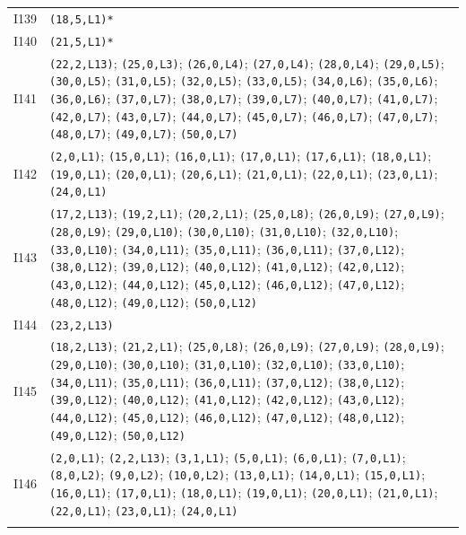 {\begin{longtable}{@{}r p{14.7cm}@{}}
I139 & \texttt{(18,5,L1)*}\\\addlinespace[3pt]
I140 & \texttt{(21,5,L1)*}\\\addlinespace[3pt]
I141 & \texttt{(22,2,L13)}; \texttt{(25,0,L3)}; \texttt{(26,0,L4)}; \texttt{(27,0,L4)}; \texttt{(28,0,L4)}; \texttt{(29,0,L5)}; \texttt{(30,0,L5)}; \texttt{(31,0,L5)}; \texttt{(32,0,L5)}; \texttt{(33,0,L5)}; \texttt{(34,0,L6)}; \texttt{(35,0,L6)}; \texttt{(36,0,L6)}; \texttt{(37,0,L7)}; \texttt{(38,0,L7)}; \texttt{(39,0,L7)}; \texttt{(40,0,L7)}; \texttt{(41,0,L7)}; \texttt{(42,0,L7)}; \texttt{(43,0,L7)}; \texttt{(44,0,L7)}; \texttt{(45,0,L7)}; \texttt{(46,0,L7)}; \texttt{(47,0,L7)}; \texttt{(48,0,L7)}; \texttt{(49,0,L7)}; \texttt{(50,0,L7)}\\\addlinespace[3pt]
I142 & \texttt{(2,0,L1)}; \texttt{(15,0,L1)}; \texttt{(16,0,L1)}; \texttt{(17,0,L1)}; \texttt{(17,6,L1)}; \texttt{(18,0,L1)}; \texttt{(19,0,L1)}; \texttt{(20,0,L1)}; \texttt{(20,6,L1)}; \texttt{(21,0,L1)}; \texttt{(22,0,L1)}; \texttt{(23,0,L1)}; \texttt{(24,0,L1)}\\\addlinespace[3pt]
I143 & \texttt{(17,2,L13)}; \texttt{(19,2,L1)}; \texttt{(20,2,L1)}; \texttt{(25,0,L8)}; \texttt{(26,0,L9)}; \texttt{(27,0,L9)}; \texttt{(28,0,L9)}; \texttt{(29,0,L10)}; \texttt{(30,0,L10)}; \texttt{(31,0,L10)}; \texttt{(32,0,L10)}; \texttt{(33,0,L10)}; \texttt{(34,0,L11)}; \texttt{(35,0,L11)}; \texttt{(36,0,L11)}; \texttt{(37,0,L12)}; \texttt{(38,0,L12)}; \texttt{(39,0,L12)}; \texttt{(40,0,L12)}; \texttt{(41,0,L12)}; \texttt{(42,0,L12)}; \texttt{(43,0,L12)}; \texttt{(44,0,L12)}; \texttt{(45,0,L12)}; \texttt{(46,0,L12)}; \texttt{(47,0,L12)}; \texttt{(48,0,L12)}; \texttt{(49,0,L12)}; \texttt{(50,0,L12)}\\\addlinespace[3pt]
I144 & \texttt{(23,2,L13)}\\\addlinespace[3pt]
I145 & \texttt{(18,2,L13)}; \texttt{(21,2,L1)}; \texttt{(25,0,L8)}; \texttt{(26,0,L9)}; \texttt{(27,0,L9)}; \texttt{(28,0,L9)}; \texttt{(29,0,L10)}; \texttt{(30,0,L10)}; \texttt{(31,0,L10)}; \texttt{(32,0,L10)}; \texttt{(33,0,L10)}; \texttt{(34,0,L11)}; \texttt{(35,0,L11)}; \texttt{(36,0,L11)}; \texttt{(37,0,L12)}; \texttt{(38,0,L12)}; \texttt{(39,0,L12)}; \texttt{(40,0,L12)}; \texttt{(41,0,L12)}; \texttt{(42,0,L12)}; \texttt{(43,0,L12)}; \texttt{(44,0,L12)}; \texttt{(45,0,L12)}; \texttt{(46,0,L12)}; \texttt{(47,0,L12)}; \texttt{(48,0,L12)}; \texttt{(49,0,L12)}; \texttt{(50,0,L12)}\\\addlinespace[3pt]
I146 & \texttt{(2,0,L1)}; \texttt{(2,2,L13)}; \texttt{(3,1,L1)}; \texttt{(5,0,L1)}; \texttt{(6,0,L1)}; \texttt{(7,0,L1)}; \texttt{(8,0,L2)}; \texttt{(9,0,L2)}; \texttt{(10,0,L2)}; \texttt{(13,0,L1)}; \texttt{(14,0,L1)}; \texttt{(15,0,L1)}; \texttt{(16,0,L1)}; \texttt{(17,0,L1)}; \texttt{(18,0,L1)}; \texttt{(19,0,L1)}; \texttt{(20,0,L1)}; \texttt{(21,0,L1)}; \texttt{(22,0,L1)}; \texttt{(23,0,L1)}; \texttt{(24,0,L1)}\\\addlinespace[3pt]

\end{longtable}}
